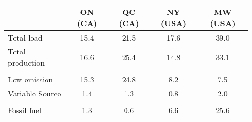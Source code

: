 \begin{tabular}{lcccc}
\toprule
  & ON (CA) & QC (CA) & NY (USA) & MW (USA) \\
\midrule
Total load & 15.4 & 21.5 & 17.6 & 39.0 \\
Total production & 16.6 & 25.4 & 14.8 & 33.1 \\
  &   &   &   &  \\
Low-emission & 15.3 & 24.8 & 8.2 & 7.5 \\
\hspace{2mm} Variable Source & 1.4 & 1.3 & 0.8 & 2.0 \\
  &   &   &   &  \\
Fossil fuel & 1.3 & 0.6 & 6.6 & 25.6 \\
\bottomrule
\bottomrule
\end{tabular}%
